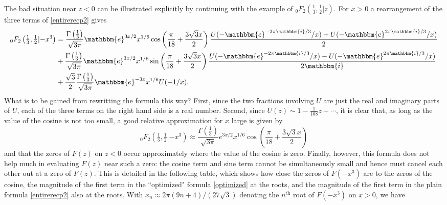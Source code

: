 \documentclass[12pt]{article}
\newcommand{\ee}[0] {\mathbbm{e}}
\newcommand{\ii}[0] {\mathbbm{i}}
\numberwithin{equation}{section}
\newcommand{\FFf}[5] {{}_{#1}{#2}_{#3} \left(#4 | {#5} \right)}
\begin{document}
The bad situation near $z<0$ can be illustrated explicitly by continuing with the example of $\FFf{0}{F}{2}{\tfrac{1}{3},\tfrac{1}{2}}{z}$. For $x>0$ a rearrangement of the three terms of \eqref{entirerecp2} gives
\begin{equation}
\label{optimized}
\begin{aligned}
\FFf{0}{F}{2}{\tfrac{1}{3},\tfrac{1}{2}}{-x^3} &= \frac{\Gamma\left(\frac{1}{3}\right)}{\sqrt{3 \pi }} \ee^{3 x/2} x^{1/6} \cos \left(\frac{\pi}{18} + \frac{3 \sqrt{3}
   x}{2}\right)\frac{U(-\ee^{-2 \pi \ii/3}/x)+U(-\ee^{2 \pi \ii/3}/x)}{2}\\
&+\frac{\Gamma\left(\frac{1}{3}\right)}{\sqrt{3 \pi }} \ee^{3 x/2} x^{1/6} \sin \left(\frac{\pi }{18} + \frac{3 \sqrt{3}
   x}{2}\right)
   \frac{U(-\ee^{-2\pi \ii/3}/x)-U(-\ee^{2\pi \ii/3}/x)}{2\ii}\\
 &+\frac{\sqrt{3}}{2} \frac{\Gamma\left(\frac{1}{3}\right)}{\sqrt{3 \pi }} \ee^{-3x} x^{1/6} U(-1/x)
\text{.}
\end{aligned}
\end{equation}
What is to be gained from rewritting the formula this way? First, since the two fractions involving $U$ are just the real and imaginary parts of $U$, each of the three terms on the right hand side is a real number. Second, since $U(z) \sim 1-\frac{1}{108}z + \cdots$, it is clear that, as long as the value of the cosine is not too small, a good relative approximation for $x$ large is given by
\begin{equation*}
\FFf{0}{F}{2}{\tfrac{1}{3},\tfrac{1}{2}}{-x^3} \approx \frac{\Gamma\left(\frac{1}{3}\right)}{\sqrt{3 \pi }} e^{3 x/2} x^{1/6}
   \cos \left(\frac{\pi }{18} + \frac{3 \sqrt{3}
   x}{2}\right)
\end{equation*}
and that the zeros of $F(z)$ on $z<0$ occur approximately where the value of the cosine is zero. Finally, however, this formula does not help much in evaluating $F(z)$ near such a zero: the cosine term and sine term cannot be simultaneously small and hence must cancel each other out at a zero of $F(z)$. This is detailed in the following table, which shows how close the zeros of $F(-x^3)$ are to the zeros of the cosine, the magnitude of the first term in the ``optimized" formula \eqref{optimized} at the roots, and the magnitude of the first term in the plain formula \eqref{entirerecp2} also at the roots. With $x_n \approx 2\pi(9n+4)/(27 \sqrt{3})$ denoting the $n^{\text{th}}$ root of $F(-x^3)$ on $x>0$, we have
\end{document}
